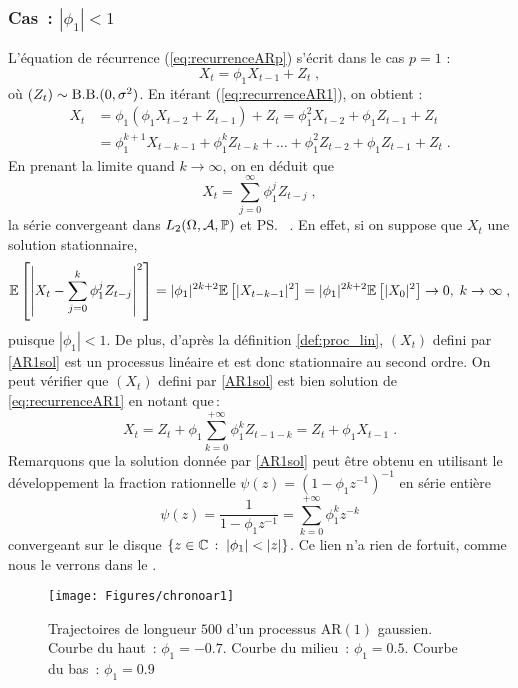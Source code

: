 \subsubsection{Cas~: $|\phi_1| < 1$}
L'\'equation de r\'ecurrence (\ref{eq:recurrenceARp}) s'\'ecrit dans le cas $p=1$ :
\begin{equation}
\label{eq:recurrenceAR1}
        X_{t} = \phi_1 X_{t-1} + Z_{t}\;,
\end{equation}
o\`u $(Z_t)\sim\mathrm{B.B.}(0,\sigma^2)$. En it\'erant (\ref{eq:recurrenceAR1}),
on obtient :
\begin{align*}
X_t&=\phi_1(\phi_1 X_{t-2}+Z_{t-1})+Z_t=\phi_1^2 X_{t-2}+\phi_1 Z_{t-1}+Z_t\\
&=\phi_1^{k+1} X_{t-k-1}+\phi_1^k Z_{t-k}+\dots+\phi_1^2 Z_{t-2}+\phi_1 Z_{t-1}
+Z_t\;.
\end{align*}
En prenant la limite quand $k \to \infty$, on en d\'eduit que
\begin{equation}\label{AR1sol}
X_t=\sum_{j=0}^{\infty}\phi_1^j Z_{t-j}\;,
\end{equation}
la s\'erie convergeant dans $L_2(\Omega,\mathcal{A},\mathbb{P})$ et \ps\ .
En effet, si on suppose que $X_t$ une solution stationnaire,
$$
{\mathbb E}\left[ \left|X_t-\sum_{j=0}^{k}\phi_1^j Z_{t-j}\right|^2 \right]
=|\phi_1|^{2k+2} {\mathbb E}\left[ |X_{t-k-1}|^2 \right]=|\phi_1|^{2k+2} {\mathbb E}\left[ |X_0|^2 \right]\to 0,\;
k\to\infty\;,
$$
puisque $|\phi_1| < 1$. De plus, d'apr\`es la d\'efinition \ref{def:proc_lin}, $(X_t)$
defini par \eqref{AR1sol} est un processus lin\'eaire et est donc stationnaire
au second ordre. On peut v\'erifier que $(X_t)$
defini par \eqref{AR1sol} est bien solution de \eqref{eq:recurrenceAR1}
en notant que\,:
\[
  X_t = Z_t + \phi_1 \sum_{k=0}^{+\infty} \phi_1^k Z_{t-1-k}
      = Z_t + \phi_1 X_{t-1}\;.
\]
Remarquons que la solution donn\'ee par \eqref{AR1sol} peut \^{e}tre obtenu
en utilisant le d\'eveloppement la fraction rationnelle $\psi(z)=(1-\phi_1
z^{-1} )^{-1}$ en s\'erie enti\`ere
\[
  \psi(z)=\frac{1}{1-\phi_1 z^{-1}} = \sum_{k=0}^{+\infty} \phi_1^k z^{-k}
\]
convergeant sur le disque $\left\{z \in \mathbb{C}\,:\; |\phi_1| < |z|\right\}$.
Ce lien n'a rien de fortuit, comme nous le verrons  dans le .
\begin{figure}
\centering
  \texttt{[image: Figures/chronoar1]}\\
  \caption{Trajectoires de longueur $500$ d'un processus AR$(1)$ gaussien.
 Courbe du haut~: $\phi_1=-0.7$.
 Courbe du milieu~: $\phi_1=0.5$.
 Courbe du bas~: $\phi_1=0.9$}
 \label{fig:figar1}
\end{figure}

